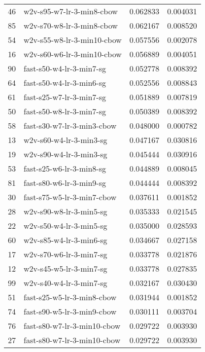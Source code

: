 {\begin{tabular}{llrr}
46 &    w2v-s95-w7-lr-3-min8-cbow &  0.062833 &  0.004031 \\
85 &    w2v-s70-w8-lr-3-min8-cbow &  0.062167 &  0.008520 \\
54 &   w2v-s55-w8-lr-3-min10-cbow &  0.057556 &  0.002078 \\
16 &   w2v-s60-w6-lr-3-min10-cbow &  0.056889 &  0.004051 \\
90 &     fast-s50-w4-lr-3-min7-sg &  0.052778 &  0.008392 \\
64 &     fast-s50-w4-lr-3-min6-sg &  0.052556 &  0.008843 \\
61 &     fast-s25-w7-lr-3-min7-sg &  0.051889 &  0.007819 \\
50 &     fast-s50-w8-lr-3-min7-sg &  0.050389 &  0.008392 \\
58 &   fast-s30-w7-lr-3-min3-cbow &  0.048000 &  0.000782 \\
13 &      w2v-s60-w4-lr-3-min3-sg &  0.047167 &  0.030816 \\
19 &      w2v-s90-w4-lr-3-min3-sg &  0.045444 &  0.030916 \\
53 &     fast-s25-w6-lr-3-min8-sg &  0.044889 &  0.008045 \\
81 &     fast-s80-w6-lr-3-min9-sg &  0.044444 &  0.008392 \\
30 &   fast-s75-w5-lr-3-min7-cbow &  0.037611 &  0.001852 \\
28 &      w2v-s90-w8-lr-3-min5-sg &  0.035333 &  0.021545 \\
22 &      w2v-s50-w4-lr-3-min5-sg &  0.035000 &  0.028593 \\
60 &      w2v-s85-w4-lr-3-min6-sg &  0.034667 &  0.027158 \\
17 &      w2v-s70-w6-lr-3-min7-sg &  0.033778 &  0.021876 \\
12 &      w2v-s45-w5-lr-3-min7-sg &  0.033778 &  0.027835 \\
99 &      w2v-s40-w4-lr-3-min7-sg &  0.032167 &  0.030430 \\
51 &   fast-s25-w5-lr-3-min8-cbow &  0.031944 &  0.001852 \\
74 &   fast-s90-w5-lr-3-min9-cbow &  0.030111 &  0.003704 \\
76 &  fast-s80-w7-lr-3-min10-cbow &  0.029722 &  0.003930 \\
27 &  fast-s80-w7-lr-3-min10-cbow &  0.029722 &  0.003930 \\
\bottomrule
\end{tabular}
}
